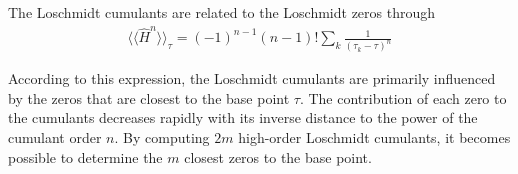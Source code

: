\documentclass[%
reprint,
superscriptaddress,
amsmath,amssymb,
aps,
pra,
floatfix,
]{revtex4-1}
\begin{document}
The Loschmidt cumulants are related to the Loschmidt zeros through
\begin{align}
	\langle \langle \hat{H}^n \rangle \rangle_{\tau}=(-1)^{n-1} (n-1)!\sum_k \frac{1}{(\tau_k-\tau)^n}
	\label{zeros}
\end{align}

According to this expression, the Loschmidt cumulants are primarily influenced by the zeros that are closest to the base point $\tau$. The contribution of each zero to the cumulants decreases rapidly with its inverse distance to the power of the cumulant order $n$. By computing $2m$ high-order Loschmidt cumulants, it becomes possible to determine the $m$ closest zeros to the base point.
%
%
\end{document}
